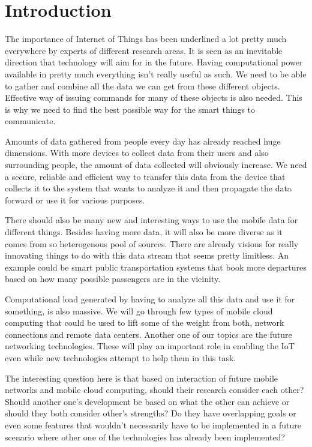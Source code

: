\documentclass[conference]{IEEEtran}
\begin{document}
\section{Introduction}
The importance of Internet of Things has been underlined a lot pretty much everywhere by experts of different research areas. It is seen as an inevitable direction that technology will aim for in the future. Having computational power available in pretty much everything isn't really useful as such. We need to be able to gather and combine all the data we can get from these different objects. Effective way of issuing commands for many of these objects is also needed. This is why we need to find the best possible way for the smart things to communicate.
\par
Amounts of data gathered from people every day has already reached huge dimensions. With more devices to collect data from their users and also surrounding people, the amount of data collected will obviously increase. We need a secure, reliable and efficient way to transfer this data from the device that collects it to the system that wants to analyze it and then propagate the data forward or use it for various purposes.
\par
There should also be many new and interesting ways to use the mobile data for different things. Besides having more data, it will also be more diverse as it comes from so heterogenous pool of sources. There are already visions for really innovating things to do with this data stream that seems pretty limitless. An example could be smart public transportation systems that book more departures based on how many possible passengers are in the vicinity.
\par
Computational load generated by having to analyze all this data and use it for something, is also massive. We will go through few types of mobile cloud computing that could be used to lift some of the weight from both, network connections and remote data centers. Another one of our topics are the future networking technologies. These will play an important role in enabling the IoT even while new technologies attempt to help them in this task.
\par
The interesting question here is that based on interaction of future mobile networks and mobile cloud computing, should their research consider each other? Should another one's development be based on what the other can achieve or should they both consider other's strengths? Do they have overlapping goals or even some features that wouldn't necessarily have to be implemented in a future scenario where other one of the technologies has already been implemented?
\end{document}

